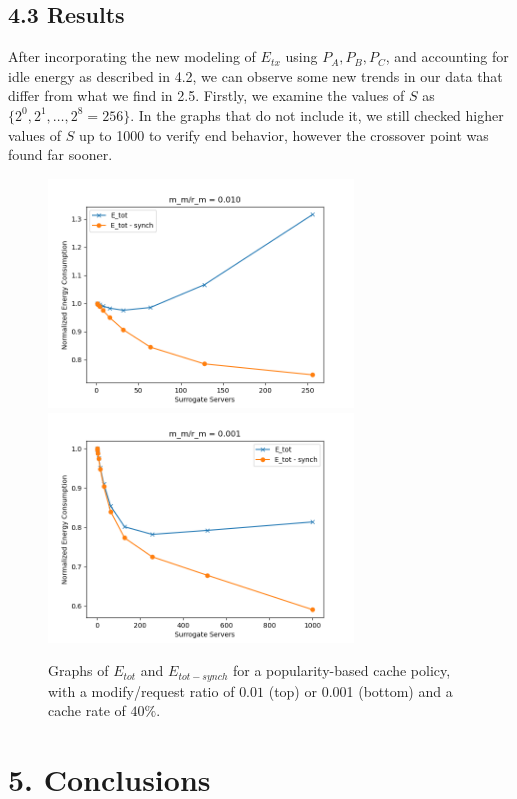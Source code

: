 \documentclass[
	a4paper, %
	10pt, %
	unnumberedsections, %
	twoside, %
]{LTJournalArticle}
\begin{document}
\subsection{4.3 Results}
After incorporating the new modeling of $E_{tx}$ using $P_A, P_B, P_C$, and accounting for idle energy as described in 4.2, we can observe some new trends in our data that differ from what we find in 2.5. Firstly, we examine the values of $S$ as $\{2^0, 2^1, \ldots, 2^8 = 256\}$. In the graphs that do not include it, we still checked higher values of $S$ up to 1000 to verify end behavior, however the crossover point was found far sooner. 
\begin{figure}[!hbt]
	\begin{center}
		\includegraphics[width=8.1cm]{plots/new0.01.png}
            \includegraphics[width=8.1cm]{plots/new0.001.png}
	\end{center}
	\caption{Graphs of $E_{tot}$ and $E_{tot - synch}$ for a popularity-based cache policy, with a modify/request ratio of $0.01$ (top) or 0.001 (bottom) and a cache rate of $40\%$.}	
\end{figure}


\section{5. Conclusions}
\end{document}
